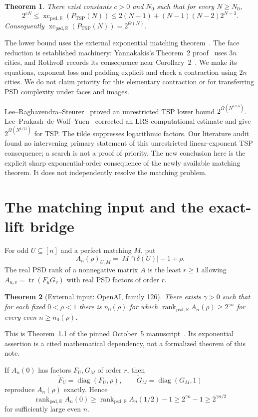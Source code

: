 \documentclass[11pt]{article}
\newtheorem{theorem}{Theorem}
\newcommand{\R}{\mathbb R}
\newcommand{\sxc}{\operatorname{xc}_{\mathrm{psd},\R}}
\newcommand{\TSP}{P_{\mathrm{TSP}}}
\begin{document}
\begin{theorem}\label{thm:tsp}
There exist constants $c>0$ and $N_0$ such that for every $N\ge N_0$,
\[
 2^{cN}\le\sxc(\TSP(N))
 \le 2(N-1)+(N-1)(N-2)2^{N-3}.
\]
Consequently $\sxc(\TSP(N))=2^{\Theta(N)}$.
\end{theorem}
The lower bound uses the external exponential matching theorem~\cite{openai126}. The face reduction is established machinery: Yannakakis's Theorem~2 proof~\cite[p.~454]{yannakakis} uses $3n$ cities, and Rothvo\ss\ records its consequence near Corollary~2~\cite{rothvoss}. We make its equations, exponent loss and padding explicit and check a contraction using $2n$ cities. We do not claim priority for this elementary contraction or for transferring PSD complexity under faces and images.

Lee--Raghavendra--Steurer~\cite[Corollary~1.2]{lrs} proved an unrestricted TSP lower bound $2^{\Omega(N^{1/13})}$. Lee--Prakash--de Wolf--Yuen~\cite[Section~1.3.1 and footnote~3]{lpdwy} corrected an LRS computational estimate and give $2^{\widetilde\Omega(N^{1/11})}$ for TSP. The tilde suppresses logarithmic factors. Our literature audit found no intervening primary statement of this unrestricted linear-exponent TSP consequence; a search is not a proof of priority. The new conclusion here is the explicit sharp exponential-order consequence of the newly available matching theorem. It does not independently resolve the matching problem.

\section{The matching input and the exact-lift bridge}
For odd $U\subseteq[n]$ and a perfect matching $M$, put
\[
 A_n(\rho)_{U,M}=|M\cap\delta(U)|-1+\rho.
\]
The real PSD rank of a nonnegative matrix $A$ is the least $r\ge1$ allowing $A_{u,v}=\operatorname{tr}(F_uG_v)$ with real PSD factors of order $r$.

\begin{theorem}[External input: OpenAI, family 126]\label{thm:input}
There exists $\gamma>0$ such that for each fixed $0<\rho<1$ there is $n_0(\rho)$ for which $\operatorname{rank}_{\mathrm{psd},\R} A_n(\rho)\ge2^{\gamma n}$ for every even $n\ge n_0(\rho)$.
\end{theorem}
This is Theorem~1.1 of the pinned October~5 manuscript~\cite{openai126}. Its exponential assertion is a cited mathematical dependency, not a formalized theorem of this note.

If $A_n(0)$ has factors $F_U,G_M$ of order $r$, then
\[
 \widetilde F_U=\operatorname{diag}(F_U,\rho),\qquad
 \widetilde G_M=\operatorname{diag}(G_M,1)
\]
reproduce $A_n(\rho)$ exactly. Hence
\begin{equation}\label{eq:shift}
 \operatorname{rank}_{\mathrm{psd},\R}A_n(0)
 \ge\operatorname{rank}_{\mathrm{psd},\R}A_n(1/2)-1
 \ge2^{\gamma n}-1\ge2^{\gamma n/2}
\end{equation}
for sufficiently large even $n$.
\end{document}
